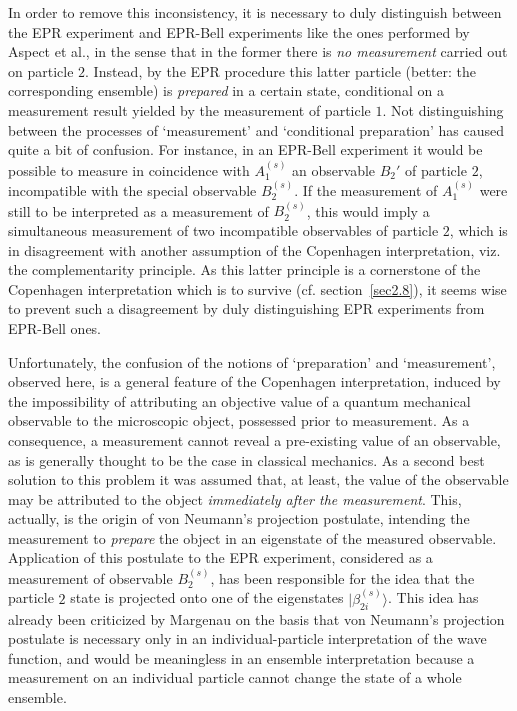 \documentclass[12pt]{article}
\begin{document}
In order to remove this inconsistency, it is necessary to duly
distinguish between the EPR experiment and EPR-Bell experiments
like the ones performed by Aspect et al., in the sense that in the
former there is {\em no measurement} carried out on particle $2$.
Instead, by the EPR procedure this latter particle (better: the
corresponding ensemble) is {\em prepared} in a certain state,
conditional on a measurement result yielded by the measurement of
particle $1$. Not distinguishing between the processes of
`measurement' and `conditional preparation' has caused quite a bit
of confusion. For instance, in an EPR-Bell experiment it would be
possible to measure in coincidence with $A_1^{(s)} $ an observable
$B_2'$ of particle $2$, incompatible with the special observable
$B_2^{(s)} $. If the measurement of $A_1^{(s)} $ were still to be
interpreted as a measurement of $B_2^{(s)} $, this would imply a
simultaneous measurement of two incompatible observables of
particle $2$, which is in disagreement with another assumption of
the Copenhagen interpretation, viz. the complementarity principle.
As this latter principle is a cornerstone of the Copenhagen
interpretation which is to survive (cf. section~\ref{sec2.8}), it
seems wise to prevent such a disagreement by duly distinguishing
EPR experiments from EPR-Bell ones.

Unfortunately, the confusion of the notions of `preparation' and
`measurement', observed here, is a general feature of the
Copenhagen interpretation, induced by the impossibility of
attributing an objective value of a quantum mechanical observable
to the microscopic object, possessed prior to measurement. As a
consequence, a measurement cannot reveal a pre-existing value of
an observable, as is generally thought to be the case in classical
mechanics. As a second best solution to this problem it was
assumed that, at least, the value of the observable may be
attributed to the object {\em immediately after the measurement}.
This, actually, is the origin of von Neumann's projection
postulate, intending the measurement to {\em prepare} the object
in an eigenstate of the measured observable. Application of this
postulate to the EPR experiment, considered as a measurement of
observable $B_2^{(s)} $, has been responsible for the idea that
the particle $2$ state is projected onto one of the eigenstates
$|\beta^{(s)}_{2i}\rangle$. This idea has already been criticized
by Margenau \cite{Marg36} on the basis that von Neumann's
projection postulate is necessary only in an individual-particle
interpretation of the wave function, and would be meaningless in
an ensemble interpretation because a measurement on an individual
particle cannot change the state of a whole ensemble.
\end{document}

